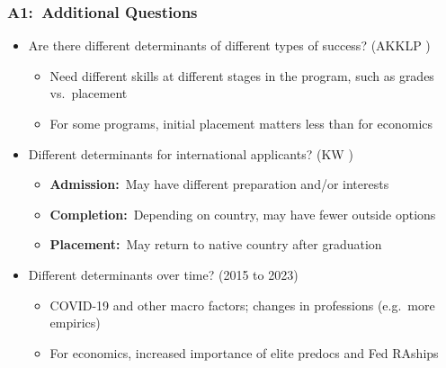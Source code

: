 \documentclass[12pt, aspectratio=169]{beamer}
\begin{document}
\begin{frame}[label=aq]
\frametitle{A1:\ Additional Questions}
\begin{itemize}
\item Are there different determinants of different types of success? (AKKLP \citeyear{athey2007})
\vspace{5pt}
\begin{itemize}
\item Need different skills at different stages in the program, such as grades vs.\ placement
\vspace{5pt}
\item For some programs, initial placement matters less than for economics
\vspace{10pt}
\end{itemize}
\item Different determinants for international applicants? (KW \citeyear{krueger2000})
\vspace{5pt}
\begin{itemize}
\item \textbf{Admission:}\ May have different preparation and/or interests
\vspace{5pt}
\item \textbf{Completion:}\ Depending on country, may have fewer outside options
\vspace{5pt}
\item \textbf{Placement:}\ May return to native country after graduation
\vspace{10pt}
\end{itemize}
\item Different determinants over time? (2015 to 2023)
\vspace{5pt}
\begin{itemize}
\item COVID-19 and other macro factors; changes in professions (e.g.\ more empirics)
\vspace{5pt}
\item For economics, increased importance of elite predocs and Fed RAships
\vspace{5pt}
\end{itemize}
\end{itemize}
\hyperlink{avsa}{}
\end{frame}
\end{document}
